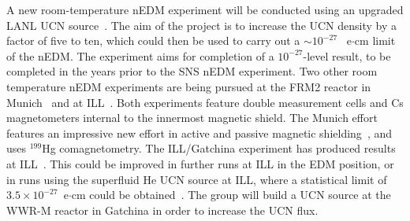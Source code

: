 A new room-temperature nEDM experiment will be conducted using an
upgraded LANL UCN source~\cite{Steven_talk}. The aim of the project is
to increase the UCN density by a factor of five to ten, which could
then be used to carry out a $\sim 10^{-27}$~ e$\cdot$cm limit of the
nEDM.  The experiment aims for completion of a $10^{-27}$-level
result, to be completed in the years prior to the SNS nEDM
experiment. Two other room temperature nEDM experiments are being
pursued at the FRM2 reactor in Munich~\cite{altarev2012} and at
ILL~\cite{Serebrov2015}. Both experiments feature double measurement
cells and Cs magnetometers internal to the innermost magnetic
shield. The Munich effort features an impressive new effort in active
and passive magnetic shielding~\cite{altarev2014magnetically,
  altarev2015large,altarev2015minimizing,altarev2012next}, and uses
$^{199}$Hg comagnetometry. The ILL/Gatchina experiment has produced
results at ILL~\cite{Serebrov2015}. This could be improved in further
runs at ILL in the EDM position, or in runs using the superfluid He
UCN source at ILL, where a statistical limit of
$3.5 \times 10^{-27}$~e$\cdot$cm could be
obtained~\cite{Serebrov_talk}. The group will build a UCN source at
the WWR-M reactor in Gatchina in order to increase the UCN flux.




 

